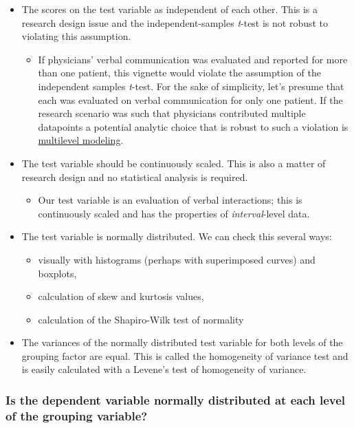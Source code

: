 \documentclass[
  11pt,
]{book}
\providecommand{\tightlist}{%
  \setlength{\itemsep}{0pt}\setlength{\parskip}{0pt}}
\begin{document}
\begin{itemize}
\tightlist
\item
  The scores on the test variable as independent of each other. This is a research design issue and the independent-samples \emph{t}-test is not robust to violating this assumption.

  \begin{itemize}
  \tightlist
  \item
    If physicians' verbal communication was evaluated and reported for more than one patient, this vignette would violate the assumption of the independent samples \emph{t}-test. For the sake of simplicity, let's presume that each was evaluated on verbal communication for only one patient. If the research scenario was such that physicians contributed multiple datapoints a potential analytic choice that is robust to such a violation is \href{https://lhbikos.github.io/MultilevelModeling/}{multilevel modeling}.
  \end{itemize}
\item
  The test variable should be continuously scaled. This is also a matter of research design and no statistical analysis is required.

  \begin{itemize}
  \tightlist
  \item
    Our test variable is an evaluation of verbal interactions; this is continuously scaled and has the properties of \emph{interval}-level data.
  \end{itemize}
\item
  The test variable is normally distributed. We can check this several ways:

  \begin{itemize}
  \tightlist
  \item
    visually with histograms (perhaps with superimposed curves) and boxplots,
  \item
    calculation of skew and kurtosis values,
  \item
    calculation of the Shapiro-Wilk test of normality
  \end{itemize}
\item
  The variances of the normally distributed test variable for both levels of the grouping factor are equal. This is called the homogeneity of variance test and is easily calculated with a Levene's test of homogeneity of variance.
\end{itemize}

\hypertarget{is-the-dependent-variable-normally-distributed-at-each-level-of-the-grouping-variable}{%
\subsubsection{Is the dependent variable normally distributed at each level of the grouping variable?}\label{is-the-dependent-variable-normally-distributed-at-each-level-of-the-grouping-variable}}
\end{document}
